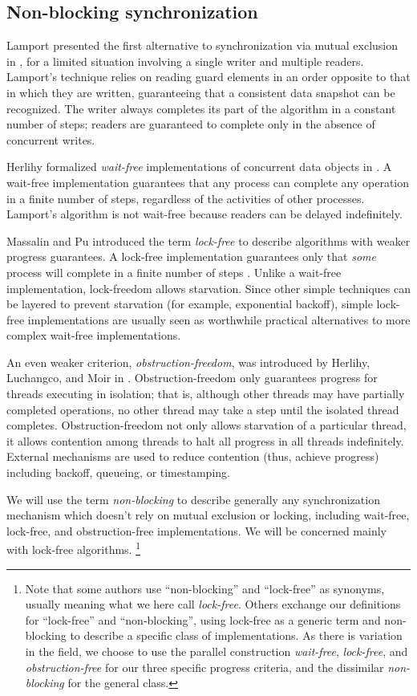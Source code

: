 \documentclass[12pt,oneside]{article}
\newcommand{\subsecput}[2]{\subsection{#2}\label{sec:#1}}
\begin{document}
\subsecput{nb-sync}{Non-blocking synchronization}

Lamport presented the first alternative to synchronization via mutual
exclusion in \cite{Lamport77}, for a limited situation involving a single
writer and multiple readers.  Lamport's technique relies on reading
guard elements in an order opposite to that in which they are written,
guaranteeing that a consistent data snapshot can be recognized.  The
writer always completes its part of the algorithm in a constant number
of steps; readers are guaranteed to complete only in the absence of
concurrent writes.

Herlihy formalized \emph{wait-free} implementations of
concurrent data objects in \cite{Herlihy88}.  A wait-free implementation
guarantees that any process can complete any operation in a finite
number of steps, regardless of the activities of other processes.
Lamport's algorithm is not wait-free
because readers can be delayed indefinitely.

Massalin and Pu introduced the term \emph{lock-free} to describe 
algorithms with weaker progress guarantees.
A lock-free implementation guarantees only that \emph{some}
process will complete in a finite number of steps
\cite{MassalinPu91}.  Unlike a wait-free implementation,
lock-freedom allows starvation.  Since other simple techniques can be
layered to prevent starvation (for example, exponential backoff),
simple lock-free implementations are usually seen as worthwhile practical
alternatives to more complex wait-free implementations.

An even weaker criterion, \emph{obstruction-freedom}, was introduced
by Herlihy, Luchangco, and Moir in \cite{HerlihyLuMo03}.
Obstruction-freedom only guarantees progress for threads executing in
isolation; that is, although other threads may have partially
completed operations, no other thread may take a step until the
isolated thread completes.  Obstruction-freedom not only allows
starvation of a particular thread, it allows contention among threads
to halt all progress in all threads
indefinitely.  External mechanisms are used to reduce contention
(thus, achieve progress) including backoff, queueing, or timestamping.

We will use the term \emph{non-blocking} to describe
generally any synchronization mechanism which doesn't rely on mutual
exclusion or locking, including wait-free, lock-free,
and obstruction-free implementations.
We will be concerned mainly with lock-free algorithms.%
\footnote{Note that some authors use ``non-blocking'' and
  ``lock-free'' as synonyms, usually meaning what we here call
  \emph{lock-free}.  Others exchange our definitions for ``lock-free''
  and ``non-blocking'', using lock-free as a generic term and non-blocking
  to describe a specific class of implementations.  As there is
  variation in the field, we choose to use the parallel construction
  \emph{wait-free}, \emph{lock-free}, and \emph{obstruction-free} for
  our three specific progress criteria, and the dissimilar
  \emph{non-blocking} for the general class.}
\end{document}
